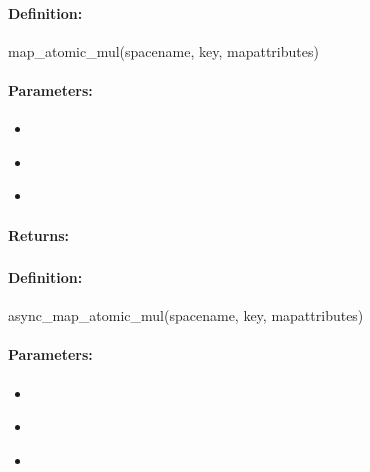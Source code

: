 \paragraph{Definition:}
\begin{rubycode}
map_atomic_mul(spacename, key, mapattributes)
\end{rubycode}

\paragraph{Parameters:}
\begin{itemize}[noitemsep]
\item {}\\

\item {}\\

\item {}\\

\end{itemize}

\paragraph{Returns:}


\pagebreak
\subsubsection{}
\label{api:ruby:async_map_atomic_mul}


\paragraph{Definition:}
\begin{rubycode}
async_map_atomic_mul(spacename, key, mapattributes)
\end{rubycode}

\paragraph{Parameters:}
\begin{itemize}[noitemsep]
\item {}\\

\item {}\\

\item {}\\

\end{itemize}

